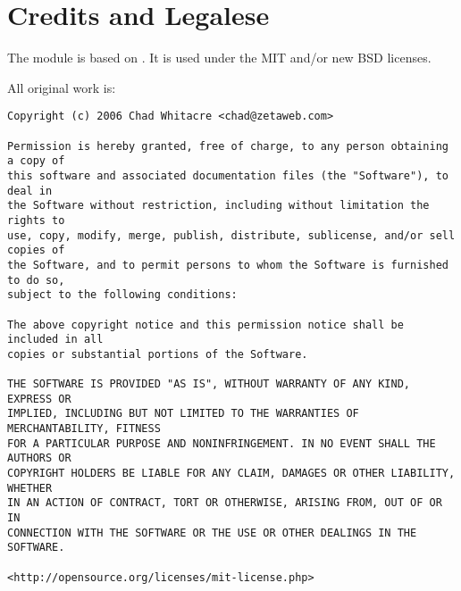 \chapter{Credits and Legalese}
\label{credits-legal}

The  module is based on .
It is used under the MIT and/or new BSD licenses.

All original work is:

\begin{verbatim}
Copyright (c) 2006 Chad Whitacre <chad@zetaweb.com>

Permission is hereby granted, free of charge, to any person obtaining a copy of
this software and associated documentation files (the "Software"), to deal in
the Software without restriction, including without limitation the rights to
use, copy, modify, merge, publish, distribute, sublicense, and/or sell copies of
the Software, and to permit persons to whom the Software is furnished to do so,
subject to the following conditions:

The above copyright notice and this permission notice shall be included in all
copies or substantial portions of the Software.

THE SOFTWARE IS PROVIDED "AS IS", WITHOUT WARRANTY OF ANY KIND, EXPRESS OR
IMPLIED, INCLUDING BUT NOT LIMITED TO THE WARRANTIES OF MERCHANTABILITY, FITNESS
FOR A PARTICULAR PURPOSE AND NONINFRINGEMENT. IN NO EVENT SHALL THE AUTHORS OR
COPYRIGHT HOLDERS BE LIABLE FOR ANY CLAIM, DAMAGES OR OTHER LIABILITY, WHETHER
IN AN ACTION OF CONTRACT, TORT OR OTHERWISE, ARISING FROM, OUT OF OR IN
CONNECTION WITH THE SOFTWARE OR THE USE OR OTHER DEALINGS IN THE SOFTWARE.

<http://opensource.org/licenses/mit-license.php>
\end{verbatim}

\begin{seealso}



\end{seealso}
